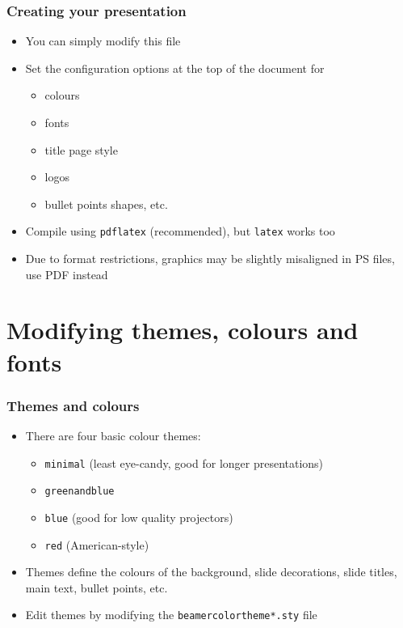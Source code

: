 \documentclass[xcolor=pdftex,t,11pt]{beamer}
\begin{document}
\begin{frame}[fragile]
\frametitle{Creating your presentation}
\begin{itemize}
\item You can simply modify this file
\item Set the configuration options at the top of the document for
\begin{itemize}
	\item colours
	\item fonts
	\item title page style
	\item logos
	\item bullet points shapes, etc.
\end{itemize}
\item Compile using \verb!pdflatex! (recommended), but \verb!latex! works too
\item Due to format restrictions, graphics may be slightly misaligned in PS files, use PDF instead
\end{itemize}
\end{frame}


\section{Modifying themes, colours and fonts}


\begin{frame}[fragile]
\frametitle{Themes and colours}
\begin{itemize}
\item There are four basic colour themes: 
\begin{itemize}
	\item \verb!minimal! (least eye-candy, good for longer presentations)
	\item \verb!greenandblue! 
	\item \verb!blue! (good for low quality projectors)
	\item \verb!red! (American-style)
\end{itemize}
\item Themes define the colours of the background, slide decorations, slide titles, main text, bullet points, etc.
\item Edit themes by modifying the \verb!beamercolortheme*.sty! file
\end{itemize}
\end{frame}
\end{document}
